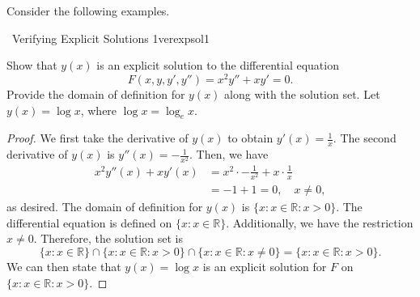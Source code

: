         \vphantom
        \\
        \\
        Consider the following examples.
        \begin{example}{\Difficulty\,\Difficulty\,\,Verifying Explicit Solutions 1}{verexpsol1}
        
            Show that \(y(x)\) is an explicit solution to the differential equation
            \begin{equation*}
                F(x,y,y',y'')=x^2y''+xy'=0.
            \end{equation*}
            Provide the domain of definition for \(y(x)\) along with the solution set. Let \(y(x)=\log x\), where \(\log x=\log_e x\).
            \begin{proof}
                We first take the derivative of \(y(x)\) to obtain \(y'(x)=\frac{1}{x}\). The second derivative of \(y(x)\) is \(y''(x)=-\frac{1}{x^2}\). Then, we have
                \begin{align*}
                    x^2y''(x)+xy'(x)&=x^2\cdot-\frac{1}{x^2}+x\cdot\frac{1}{x} \\
                    &=-1+1=0,\quad x\neq0,
                \end{align*}
                as desired. The domain of definition for \(y(x)\) is \(\{x:x\in \mathbb{R}:x>0\}\). The differential equation is defined on \(\{x:x\in\mathbb{R}\}\). Additionally, we have the restriction \(x\neq 0\). Therefore, the solution set is 
                \begin{equation*}
                    \{x:x\in\mathbb{R}\}\cap\{x:x\in\mathbb{R}:x>0\}\cap\{x:x\in\mathbb{R}:x\neq0\}=\{x:x\in\mathbb{R}:x>0\}.
                \end{equation*}
                We can then state that \(y(x)=\log x\) is an explicit solution for \(F\) on \(\{x:x\in\mathbb{R}:x>0\}\).
            \end{proof}

        \end{example}
